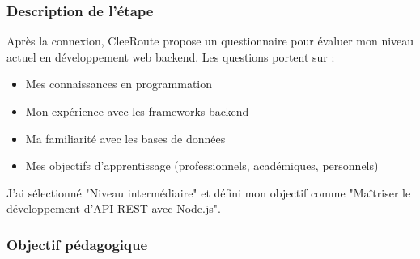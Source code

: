 \documentclass[12pt,a4paper]{article}
\begin{document}
\subsubsection{Description de l'étape}

Après la connexion, CleeRoute propose un questionnaire pour évaluer mon niveau actuel en développement web backend. Les questions portent sur :
\begin{itemize}
    \item Mes connaissances en programmation
    \item Mon expérience avec les frameworks backend
    \item Ma familiarité avec les bases de données
    \item Mes objectifs d'apprentissage (professionnels, académiques, personnels)
\end{itemize}

J'ai sélectionné "Niveau intermédiaire" et défini mon objectif comme "Maîtriser le développement d'API REST avec Node.js".

\subsubsection{Objectif pédagogique}
\end{document}
